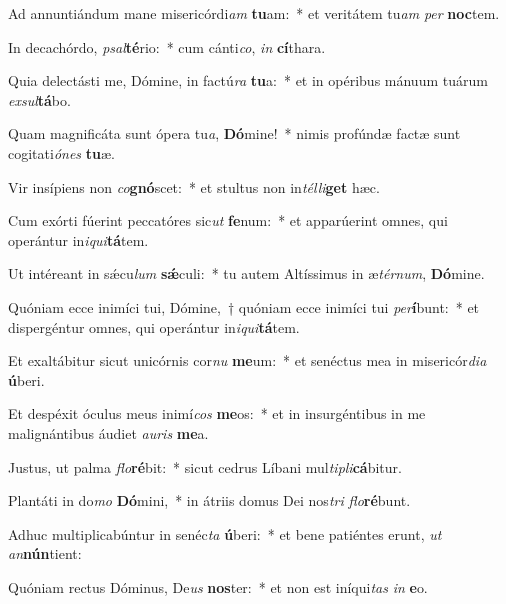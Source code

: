 \item Ad annuntiándum mane misericórdi\textit{am} \textbf{tu}am:~* et veritátem tu\textit{am} \textit{per} \textbf{noc}tem.
\item In decachórdo, \textit{psal}\textbf{té}rio:~* cum cánti\textit{co}, \textit{in} \textbf{cí}thara.
\item Quia delectásti me, Dómine, in factú\textit{ra} \textbf{tu}a:~* et in opéribus mánuum tuárum \textit{ex}\textit{sul}\textbf{tá}bo.
\item Quam magnificáta sunt ópera tu\textit{a}, \textbf{Dó}mine!~* nimis profúndæ factæ sunt cogitati\textit{ó}\textit{nes} \textbf{tu}æ.
\item Vir insípiens non \textit{co}\textbf{gnó}scet:~* et stultus non in\textit{tél}\textit{li}\textbf{get} hæc.
\item Cum exórti fúerint peccatóres sic\textit{ut} \textbf{fe}num:~* et apparúerint omnes, qui operántur in\textit{i}\textit{qui}\textbf{tá}tem.
\item Ut intéreant in sǽcu\textit{lum} \textbf{sǽ}culi:~* tu autem Altíssimus in æ\textit{tér}\textit{num}, \textbf{Dó}mine.
\item Quóniam ecce inimíci tui, Dómine,~† quóniam ecce inimíci tui \textit{per}\textbf{í}bunt:~* et dispergéntur omnes, qui operántur in\textit{i}\textit{qui}\textbf{tá}tem.
\item Et exaltábitur sicut unicórnis cor\textit{nu} \textbf{me}um:~* et senéctus mea in misericór\textit{di}\textit{a} \textbf{ú}beri.
\item Et despéxit óculus meus inimí\textit{cos} \textbf{me}os:~* et in insurgéntibus in me malignántibus áudiet \textit{au}\textit{ris} \textbf{me}a.
\item Justus, ut palma \textit{flo}\textbf{ré}bit:~* sicut cedrus Líbani mul\textit{ti}\textit{pli}\textbf{cá}bitur.
\item Plantáti in do\textit{mo} \textbf{Dó}mini,~* in átriis domus Dei nos\textit{tri} \textit{flo}\textbf{ré}bunt.
\item Adhuc multiplicabúntur in senéc\textit{ta} \textbf{ú}beri:~* et bene patiéntes erunt, \textit{ut} \textit{an}\textbf{nún}tient:
\item Quóniam rectus Dóminus, De\textit{us} \textbf{nos}ter:~* et non est iníqui\textit{tas} \textit{in} \textbf{e}o.
